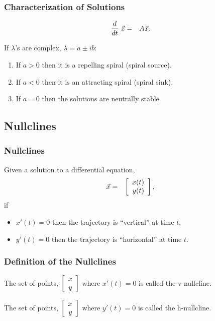 \begin{frame}
  \frametitle{Characterization of Solutions}

  \begin{eqnarray*}
    \deriv{~}{t} \vec{x} & = & A \vec{x}.
  \end{eqnarray*}

  If $\lambda$'s are complex, $\lambda = a \pm ib$:
  \begin{enumerate}
  \item If $a>0$ then it is a repelling spiral (spiral source).
  \item If $a<0$ then it is an attracting spiral (spiral sink).
  \item If $a=0$ then the solutions are neutrally stable.
  \end{enumerate}

\end{frame}


\subsection{Nullclines}

\begin{frame}
  \frametitle{Nullclines}

  Given a solution to a differential equation,
  \begin{eqnarray*}
    \vec{x} & = & \vecTwo{x(t)}{y(t)},
  \end{eqnarray*}
  if
  \begin{itemize}
  \item $x'(t)=0$ then the trajectory is ``vertical'' at time $t$,
  \item $y'(t)=0$ then the trajectory is ``horizontal'' at time $t$.
  \end{itemize}

\end{frame}


\begin{frame}
  \frametitle{Definition of the Nullclines}

  \begin{definition}
    The set of points, $\vecTwo{x}{y}$ where $x'(t)=0$ is called the
    v-nullcline. 
  \end{definition}


  \begin{definition}
    The set of points, $\vecTwo{x}{y}$ where $y'(t)=0$ is called the
    h-nullcline.
  \end{definition}


\end{frame}


